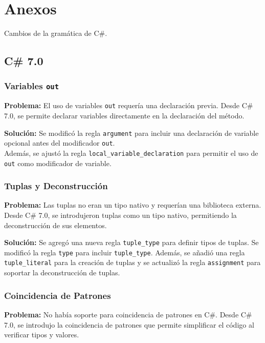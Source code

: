 \chapter*{Anexos} \label{anex}

Cambios de la gramática de C\#.

\section*{C\# 7.0}

\subsection*{Variables \texttt{out}}
\textbf{Problema:} El uso de variables \texttt{out} requería una declaración previa. Desde C\# 7.0, se permite declarar variables directamente en la declaración del método.

\textbf{Solución:} Se modificó la regla \texttt{argument} para incluir una declaración de variable opcional antes del modificador \texttt{out}. \\
 Además, se ajustó la regla \texttt{local\_variable\_declaration} para permitir el uso de \texttt{out} como modificador de variable.

\subsection*{Tuplas y Deconstrucción}
\textbf{Problema:} Las tuplas no eran un tipo nativo y requerían una biblioteca externa. Desde C\# 7.0, se introdujeron tuplas como un tipo nativo, permitiendo la deconstrucción de sus elementos.

\textbf{Solución:} Se agregó una nueva regla \texttt{tuple\_type} para definir tipos de tuplas. Se modificó la regla \texttt{type} para incluir \texttt{tuple\_type}. Además, se añadió una regla \texttt{tuple\_literal} para la creación de tuplas y se actualizó la regla \texttt{assignment} para soportar la deconstrucción de tuplas.

\subsection*{Coincidencia de Patrones}
\textbf{Problema:} No había soporte para coincidencia de patrones en C\#. Desde C\# 7.0, se introdujo la coincidencia de patrones que permite simplificar el código al verificar tipos y valores.

